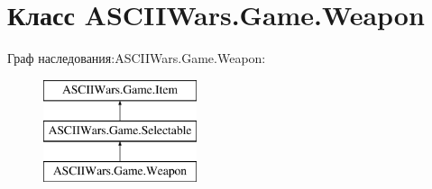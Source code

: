 \hypertarget{class_a_s_c_i_i_wars_1_1_game_1_1_weapon}{}\section{Класс A\+S\+C\+I\+I\+Wars.\+Game.\+Weapon}
\label{class_a_s_c_i_i_wars_1_1_game_1_1_weapon}
Граф наследования\+:A\+S\+C\+I\+I\+Wars.\+Game.\+Weapon\+:\begin{figure}[H]
\begin{center}
\leavevmode
\includegraphics[height=3.000000cm]{class_a_s_c_i_i_wars_1_1_game_1_1_weapon}
\end{center}
\end{figure}
